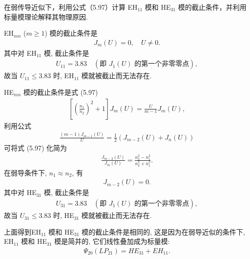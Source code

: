 \documentclass{assignment}
\begin{document}
\begin{prob}
    在弱传导近似下，利用公式（5.97）计算 EH$_{11}$ 模和 HE$_{31}$ 模的截止条件，并利用标量模理论解释其物理原因.
\end{prob}
\begin{sol}
    EH$_{mn}$ ($m\geq 1$) 模的截止条件是
    \begin{align}
        J_m(U)=0,\quad U\neq 0.
    \end{align}
    其中对 EH$_{11}$ 模, 截止条件是
    \begin{align}
        U_{11}=3.83\quad(\text{即 $J_1(U)$ 的第一个非零零点}),
    \end{align}
    故当 $U_{11}\leq 3.83$ 时, EH$_{11}$ 模就被截止而无法存在.

    HE$_{mn}$ 模的截止条件是式 (5.97)
    \begin{align}
        \left[\left(\frac{n_1}{n_2}\right)^2+1\right]J_m(U)=\frac{U}{m-1}J_m(U),
    \end{align}
    利用公式
    \begin{align}
        \frac{(m-1)J_{m-1}(U)}{U}=\frac{1}{2}(J_{m-2}(U)+J_n(U))
    \end{align}
    可将式 (5.97) 化简为
    \begin{align}
        \frac{J_{m-2}(U)}{J_m(U)}=\frac{n_2^2-n_1^2}{n_2^2+n_1^2}.
    \end{align}
    在弱导条件下, $n_1\approx n_2$, 有
    \begin{align}
        J_{m-2}(U)=0.
    \end{align}
    其中对 HE$_{31}$ 模, 截止条件是
    \begin{align}
        U_{31}=3.83\quad(\text{即 $J_1(U)$ 的第一个非零零点}),
    \end{align}
    故当 $U_{31}\leq 3.83$ 时, HE$_{31}$ 模就被截止而无法存在.

    上面得到EH$_{11}$ 模和 HE$_{31}$ 模的截止条件是相同的, 这是因为在弱导近似的条件下, EH$_{11}$ 模和 HE$_{31}$ 模是简并的, 它们线性叠加成为标量模:
    \begin{align}
        \Psi_{20}(LP_{21})=HE_{31}+EH_{11}.
    \end{align}
\end{sol}
\end{document}
